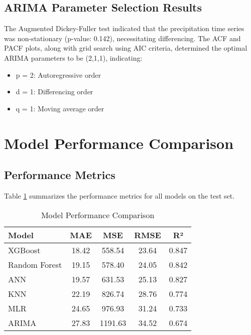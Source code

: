 \documentclass[12pt]{article}
\begin{document}
\subsection{ARIMA Parameter Selection Results}
\label{subsec:arima_selection_results}

The Augmented Dickey-Fuller test indicated that the precipitation time series was non-stationary (p-value: 0.142), necessitating differencing. The ACF and PACF plots, along with grid search using AIC criteria, determined the optimal ARIMA parameters to be (2,1,1), indicating:
\begin{itemize}
    \item p = 2: Autoregressive order
    \item d = 1: Differencing order
    \item q = 1: Moving average order
\end{itemize}

\section{Model Performance Comparison}
\label{sec:model_comparison}

\subsection{Performance Metrics}
\label{subsec:metrics_comparison}

Table \ref{tab:model_performance} summarizes the performance metrics for all models on the test set.

\begin{table}[h]
\centering
\caption{Model Performance Comparison}
\label{tab:model_performance}
\begin{tabular}{|l|c|c|c|c|}
\hline
\textbf{Model} & \textbf{MAE} & \textbf{MSE} & \textbf{RMSE} & \textbf{R²} \\
\hline
XGBoost & 18.42 & 558.54 & 23.64 & 0.847 \\
\hline
Random Forest & 19.15 & 578.40 & 24.05 & 0.842 \\
\hline
ANN & 19.57 & 631.53 & 25.13 & 0.827 \\
\hline
KNN & 22.19 & 826.74 & 28.76 & 0.774 \\
\hline
MLR & 24.65 & 976.93 & 31.24 & 0.733 \\
\hline
ARIMA & 27.83 & 1191.63 & 34.52 & 0.674 \\
\hline
\end{tabular}
\end{table}
\end{document}
